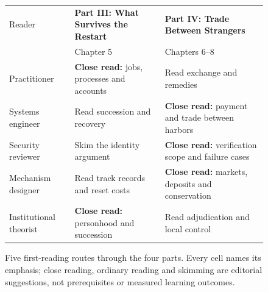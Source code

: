 \begin{figure}[H]
\centering
{\pdfiglabel\renewcommand{\arraystretch}{1.7}\setlength{\tabcolsep}{5pt}%
\begin{tabularx}{\linewidth}{@{}p{2.2cm}XX@{}}
\toprule
Reader & \textbf{Part III: What Survives the Restart} & \textbf{Part IV: Trade Between Strangers}\\
 & Chapter 5 & Chapters 6--8\\
\midrule
Practitioner & \textbf{Close read:} jobs, processes and accounts & Read exchange and remedies\\
Systems engineer & Read succession and recovery & \textbf{Close read:} payment and trade between harbors\\
Security reviewer & Skim the identity argument & \textbf{Close read:} verification scope and failure cases\\
Mechanism designer & Read track records and reset costs & \textbf{Close read:} markets, deposits and conservation\\
Institutional theorist & \textbf{Close read:} personhood and succession & Read adjudication and local control\\
\bottomrule
\end{tabularx}}
\caption{Five first-reading routes through the four parts. Every cell names its emphasis; close reading, ordinary reading and skimming are editorial suggestions, not prerequisites or measured learning outcomes.}
\label{fig:book-reader-map}
\end{figure}
\endgroup
